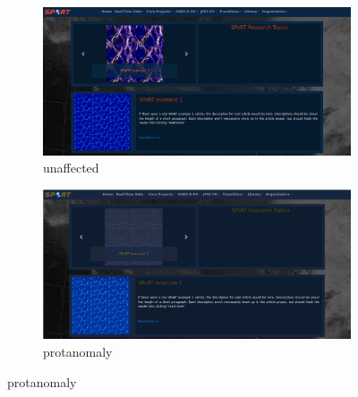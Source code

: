 \documentclass[12pt]{article}
\begin{document}
\begin{figure}
\centering
\begin{subfigure}{.5\textwidth}
  \centering
  \includegraphics[width=.98\linewidth]{./figures/acc-unaffected}
  \caption{unaffected}
  \label{acc-unaffected} %
\end{subfigure}%
\begin{subfigure}{.5\textwidth}
  \centering
  \includegraphics[width=.98\linewidth]{./figures/acc-protanomaly}
  \caption{protanomaly}
  \label{acc-protanomaly} %
\end{subfigure}
\end{figure}
\end{document}
